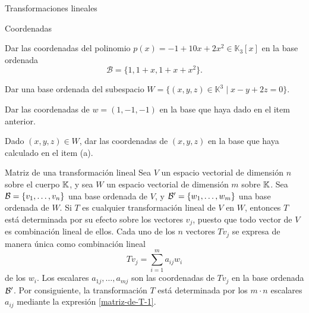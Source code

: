 \begin{chapter}{Transformaciones lineales}
\begin{section}{Coordenadas}
\begin{enumex}
        \item Dar las coordenadas del polinomio $p(x) = -1+10x+2x^2\in\mathbb{K}_3[x]$ en la base ordenada $$\mathcal{B}=\{1,1+x,1+x+x^2\}.$$

        \item
        \begin{enumex}
            \item Dar una base ordenada del subespacio $W=\{(x,y,z)\in\mathbb{K}^3\mid x-y+2z=0\}$.
            \item Dar las coordenadas de $w=(1,-1,-1)$ en la base que haya dado en el item anterior.
            \item Dado $(x,y,z)\in W$, dar las coordenadas de $(x,y,z)$ en la base que haya calculado en el item (a).
        \end{enumex}
    \end{enumex}
    
    \end{section}


        \begin{section}{Matriz de una transformaci\'on lineal}\label{seccion-matriz-de-una-tl}
            Sea $V$ un espacio vectorial de dimensión $n$ sobre el cuerpo $\mathbb K$, y sea $W$ un espacio vectorial de dimensión $m$ sobre $\mathbb K$. Sea $\mathcal{B} = \{v_1,\ldots,v_n\}$ una base ordenada de $V$, y $\mathcal{B}' = \{w_1,\ldots,w_m\}$ una base ordenada de $W$. Si $T$ es cualquier 		transformación lineal de $V$ en $W$, entonces $T$ está determinada por su efecto sobre los vectores $v_j$, puesto que todo vector de $V$ es combinación lineal de ellos. Cada uno de los $n$ vectores $Tv_j$ se expresa de manera única 	como combinación lineal
            \begin{equation}\label{matriz-de-T-1}
                Tv_j = \sum_{i=1}^{m} a_{ij} w_i
            \end{equation}
            de los $w_i$. Los escalares $a_{1j},\ldots,a_{mj}$ son las coordenadas de $Tv_j$ en la base ordenada $\mathcal{B}'$. Por consiguiente, la transformación $T$ está determinada por los
            $m\cdot n$ escalares $a_{ij}$ mediante la expresión \eqref{matriz-de-T-1}. 
            

\end{section}
\end{chapter}
